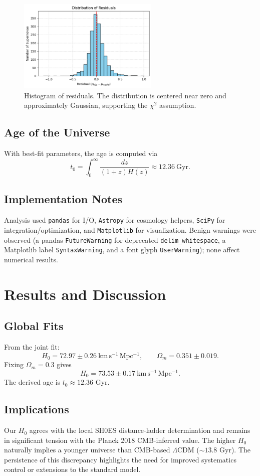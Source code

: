\documentclass[12pt]{article}
\begin{document}
\begin{figure}[H]
    \centering
    \includegraphics[width=0.6\textwidth]{residuals_histogram.png}
    \caption{Histogram of residuals. The distribution is centered near zero and approximately Gaussian, supporting the $\chi^2$ assumption.}
    \label{fig:resid_hist}
\end{figure}

\subsection{Age of the Universe}
With best-fit parameters, the age is computed via
\[
t_0 = \int_0^\infty \frac{dz}{(1+z)H(z)} \approx 12.36~\mathrm{Gyr}.
\]

\subsection{Implementation Notes}
Analysis used \texttt{pandas} for I/O, \texttt{Astropy} for cosmology helpers, \texttt{SciPy} for integration/optimization, and \texttt{Matplotlib} for visualization. 
Benign warnings were observed (a pandas \texttt{FutureWarning} for deprecated \texttt{delim\_whitespace}, a Matplotlib label \texttt{SyntaxWarning}, and a font glyph \texttt{UserWarning}); 
none affect numerical results.

\newpage
\section{Results and Discussion}
\subsection{Global Fits}
From the joint fit:
\[
H_0 = 72.97 \pm 0.26 \ \mathrm{km\,s^{-1}\,Mpc^{-1}}, \qquad \Omega_m = 0.351 \pm 0.019.
\]
Fixing $\Omega_m=0.3$ gives
\[
H_0 = 73.53 \pm 0.17 \ \mathrm{km\,s^{-1}\,Mpc^{-1}}.
\]
The derived age is $t_0 \approx 12.36$ Gyr.

\subsection{Implications}
Our $H_0$ agrees with the local SH0ES distance-ladder determination and remains in significant tension with the Planck 2018 CMB-inferred value. 
The higher $H_0$ naturally implies a younger universe than CMB-based $\Lambda$CDM ($\sim 13.8$ Gyr). The persistence of this discrepancy highlights 
the need for improved systematics control or extensions to the standard model.
\end{document}
